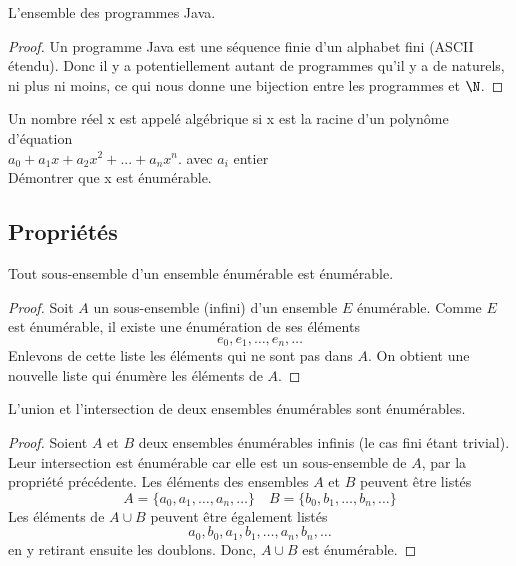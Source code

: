  \begin{myexem}
 \label{exem:programme_java}
  L'ensemble des programmes Java.
  \begin{proof}
   Un programme Java est une séquence finie d'un alphabet fini (ASCII étendu). Donc il y a potentiellement autant de programmes qu'il y a de naturels, ni plus ni moins, ce qui nous donne une bijection entre les programmes et $\N$.
  \end{proof}
\end{myexem}

\begin{myexercice} \label{exerc:ensembleEnumNumAlgebrique}
Un nombre réel x est appelé algébrique si x est la racine d'un polynôme d'équation\\
\indent $a_0 + a_1x + a_2x^2 + ... + a_nx^n$.  avec $a_i$ entier\\
Démontrer que x est énumérable.
\end{myexercice}

\subsection{Propriétés}
\label{subsec:proprietes}

\begin{myprop}
	Tout sous-ensemble d'un ensemble énumérable est énumérable.
	\begin{proof}
Soit $A$ un sous-ensemble (infini) d'un ensemble $E$ énumérable. Comme $E$ est énumérable, il existe une énumération de ses éléments
\[
e_0, e_1, \ldots , e_n, \ldots
\]
Enlevons de cette liste les éléments qui ne sont pas dans $A$. On obtient une nouvelle liste qui énumère les éléments de $A$.
	\end{proof}
\end{myprop}

\begin{myprop}
	L'union et l'intersection de deux ensembles énumérables sont énumérables.
	\begin{proof}
		Soient $A$ et $B$ deux ensembles énumérables infinis (le cas fini étant trivial). Leur intersection est énumérable car elle est un sous-ensemble de $A$, par la propriété précédente. Les éléments des ensembles $A$ et $B$ peuvent être listés
\[
A = \{ a_0, a_1, \ldots , a_n, \ldots\}  \quad
B = \{ b_0, b_1, \ldots , b_n, \ldots\}
\]
Les éléments de $A \cup B$ peuvent être également listés
\[
a_0, b_0, a_1, b_1, \ldots, a_n, b_n, \ldots
\]
en y retirant ensuite les doublons. Donc, $A \cup B$ est énumérable.
	\end{proof}
\end{myprop}

